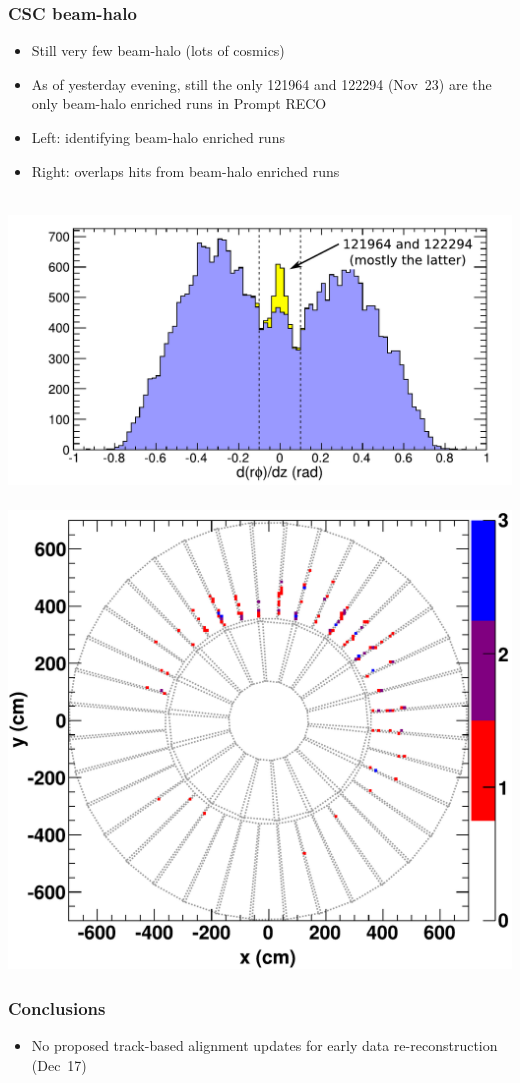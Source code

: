\documentclass[compress]{beamer}
\begin{document}
\begin{frame}
\frametitle{CSC beam-halo}

\begin{itemize}
\item Still very few beam-halo (lots of cosmics)

\item As of yesterday evening, still the only 121964 and 122294 (Nov~23) are
  the only beam-halo enriched runs in Prompt RECO

\item Left: identifying beam-halo enriched runs

\item Right: overlaps hits from beam-halo enriched runs
\end{itemize}

\mbox{\hspace{-1 cm}
\includegraphics[height=4 cm]{beamhalo_fraction.pdf}
\includegraphics[height=4 cm]{xyoccupancy.pdf}}
\end{frame}




\begin{frame}
\frametitle{Conclusions}

\begin{itemize}
\item No proposed track-based alignment updates for early data
  re-reconstruction (Dec~17)
\end{itemize}

\label{numpages}
\end{frame}
\end{document}
